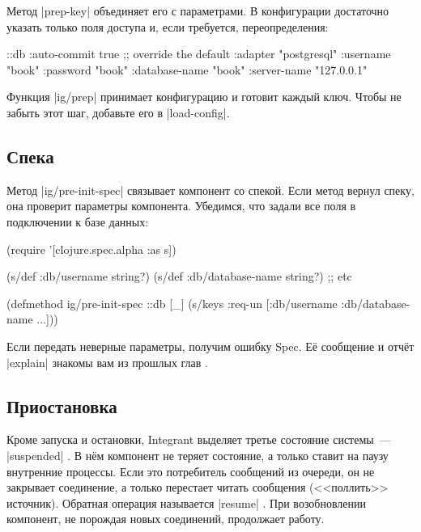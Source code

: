 Метод \spverb|prep-key| объединяет его с параметрами. В конфигурации достаточно
указать только поля доступа и, если требуется, переопределения:

\begin{english}
  \begin{clojure}
{::db {:auto-commit   true ;; override the default
       :adapter       "postgresql"
       :username      "book"
       :password      "book"
       :database-name "book"
       :server-name   "127.0.0.1"}}
  \end{clojure}
\end{english}

Функция \spverb|ig/prep| принимает конфигурацию и готовит каждый ключ. Чтобы не
забыть этот шаг, добавьте его в \spverb|load-config|.

\subsection{Спека}

Метод \spverb|ig/pre-init-spec| связывает компонент со спекой. Если метод вернул
спеку, она проверит параметры компонента. Убедимся, что задали все поля в
подключении к базе данных:

\begin{english}
  \begin{clojure}
(require '[clojure.spec.alpha :as s])

(s/def :db/username string?)
(s/def :db/database-name string?)
;; etc

(defmethod ig/pre-init-spec ::db [_]
  (s/keys :req-un [:db/username
                   :db/database-name
                   ...]))
  \end{clojure}
\end{english}

\noindent
Если передать неверные параметры, получим ошибку Spec. Е\"{е} сообщение и
отч\"{е}т \spverb|explain| знакомы вам из прошлых глав .

\subsection{Приостановка}

Кроме запуска и остановки, Integrant выделяет третье состояние системы~---
\spverb|suspended| . В н\"{е}м компонент не теряет
состояние, а только ставит на паузу внутренние процессы. Если это потребитель
сообщений из очереди, он не закрывает соединение, а только перестает читать
сообщения (<<поллить>> источник). Обратная операция называется \spverb|resume|
. При возобновлении компонент, не порождая новых соединений,
продолжает работу.

